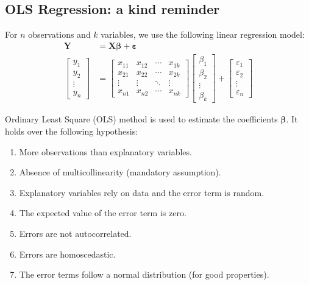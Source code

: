 \subsection{OLS Regression: a kind reminder}
For $n$ observations and $k$ variables, we use the following linear regression model:
\begin{align*}
    \boldsymbol{Y} & = \boldsymbol{X} \boldsymbol{\beta} + \boldsymbol{\varepsilon} \\
    \begin{bmatrix} 
        y_1 \\ y_2 \\ \vdots \\ y_n 
        \end{bmatrix} & = \begin{bmatrix}
        x_{11} & x_{12} & \cdots & x_{1k} \\ 
        x_{21} & x_{22} & \cdots & x_{2k} \\ 
        \vdots & \vdots & \ddots & \vdots \\ 
        x_{n1} & x_{n2} & \cdots & x_{nk} 
        \end{bmatrix} \begin{bmatrix}
        \beta_1 \\ \beta_2 \\ \vdots \\ \beta_k 
        \end{bmatrix} + \begin{bmatrix} 
        \varepsilon_1 \\ \varepsilon_2 \\ \vdots \\ \varepsilon_n \end{bmatrix}
\end{align*}

Ordinary Least Square (OLS) method is used to estimate the coefficients $\boldsymbol{\beta}$. It holds over the following hypothesis:
\begin{enumerate}
    \item More observations than explanatory variables.
    \item Absence of multicollinearity (mandatory assumption).
    \item Explanatory variables rely on data and the error term is random.
    \item The expected value of the error term is zero.
    \item Errors are not autocorrelated.
    \item Errors are homoscedastic.
    \item The error terms follow a normal distribution (for good properties).
\end{enumerate}


